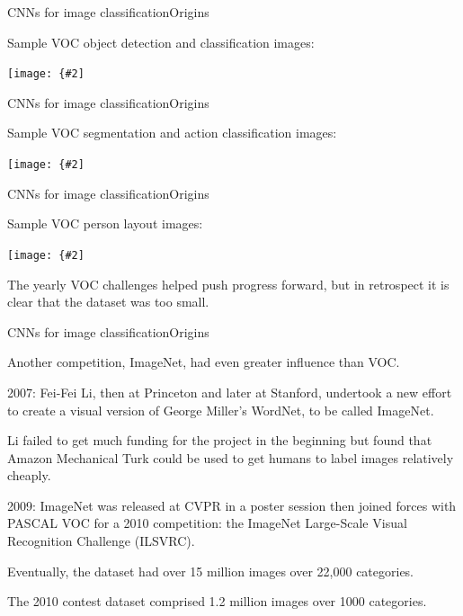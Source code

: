 \documentclass[aspectratio=169]{beamer}
\newcommand{\myfig}[3]{\centerline{\texttt{[image: \{\#2]}}}
\begin{document}
\begin{frame}{CNNs for image classification}{Origins}

  Sample VOC object detection and classification images:

  \myfig{4.5in}{everingham-fig1}{Everingham et al.\ (2015), Fig.\ 1a}

\end{frame}


\begin{frame}{CNNs for image classification}{Origins}

  Sample VOC segmentation and action classification images:

  \myfig{4.5in}{everingham-fig1bc}{Everingham et al.\ (2015), Fig.\ 1b-c}

\end{frame}


\begin{frame}{CNNs for image classification}{Origins}

  Sample VOC person layout images:

  \medskip
  
  \myfig{4.5in}{everingham-fig1d}{Everingham et al.\ (2015), Fig.\ 1d}

  \medskip
  
  The yearly VOC challenges helped push progress forward, but in retrospect
  it is clear that the dataset was too small.

\end{frame}


\begin{frame}{CNNs for image classification}{Origins}

  Another competition, ImageNet, had even greater influence than VOC.

  \medskip
  
  2007: Fei-Fei Li, then at Princeton and later at Stanford, undertook
  a new effort to create a visual version of George Miller's WordNet,
  to be called ImageNet.

  \medskip

  Li failed to get much funding for the project in the beginning but
  found that Amazon Mechanical Turk could be used to get humans to
  label images relatively cheaply.

  \medskip

  2009: ImageNet was released at CVPR in a poster session then joined
  forces with PASCAL VOC for a 2010 competition: the \alert{ImageNet
  Large-Scale Visual Recognition Challenge (ILSVRC)}.

  \medskip

  Eventually, the dataset had over 15 million images over 22,000 categories.

  \medskip

  The 2010 contest dataset comprised 1.2 million images over 1000 categories.
  
\end{frame}
\end{document}
